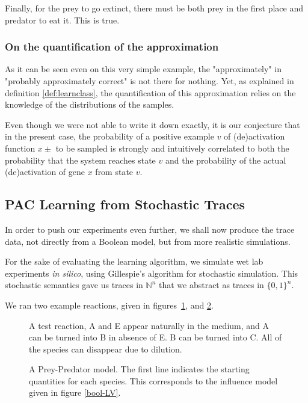\documentclass{llncs}
\begin{document}
Finally, for the prey to go extinct, there must be both prey in the first place and predator to eat it. This is true.

\subsubsection{On the quantification of the approximation}

As it can be seen even on this very simple example, the "approximately" in "probably approximately correct" is not there for nothing. Yet, as explained in definition \ref{def:learnclass}, the quantification of this approximation relies on the knowledge of the distributions of the samples.

Even though we were not able to write it down exactly, it is our conjecture that in the present case, the probability of a positive example $v$ of (de)activation function $x\pm$ to be sampled is strongly and intuitively correlated to both the probability that the system reaches state $v$ and the probability of the actual (de)activation of gene $x$ from state $v$. 



\subsection{PAC Learning from Stochastic Traces}

In order to push our experiments even further, we shall now produce the trace
data, not directly from a Boolean model, but from more realistic simulations.

For the sake of evaluating the learning algorithm,
we simulate wet lab experiments \emph{in silico}, using Gillespie's algorithm for stochastic simulation.
This stochastic semantics gave us traces in ${\mathbb{N}}^n$ that we abstract as traces in ${\{0,1\}}^n$.



We ran two example reactions, given in figures~\ref{test}, and \ref{preypred}.

\begin{figure}[htbp]
	
	\vspace{-1em}
	\caption{A test reaction, A and E appear naturally in the medium, and A can be turned into B in absence of E. B  can be turned into C. All of the species can disappear due to dilution.\label{test}}
\end{figure}
\begin{figure}[htbp]
	
	\vspace{-1em}
	\caption{A Prey-Predator model. The first line indicates the starting quantities for each species. This corresponds to the influence model given in figure \ref{bool-LV}.\label{preypred}}
\end{figure}
\end{document}
